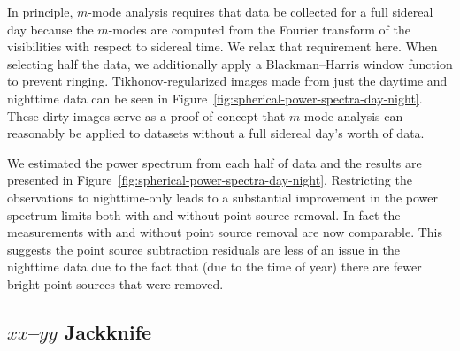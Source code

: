 \begin{bibunit}
In principle, $m$-mode analysis requires that data be collected for a full sidereal day because the
$m$-modes are computed from the Fourier transform of the visibilities with respect to sidereal time.
We relax that requirement here.  When selecting half the data, we additionally apply a
Blackman--Harris window function to prevent ringing. Tikhonov-regularized images made from just the
daytime and nighttime data can be seen in Figure~\ref{fig:spherical-power-spectra-day-night}. These
dirty images serve as a proof of concept that $m$-mode analysis can reasonably be applied to
datasets without a full sidereal day's worth of data.

We estimated the power spectrum from each half of data and the results are presented in
Figure~\ref{fig:spherical-power-spectra-day-night}. Restricting the observations to nighttime-only
leads to a substantial improvement in the power spectrum limits both with and without point source
removal. In fact the measurements with and without point source removal are now comparable. This
suggests the point source subtraction residuals are less of an issue in the nighttime data due to
the fact that (due to the time of year) there are fewer bright point sources that were removed.

\subsection{$xx$--$yy$ Jackknife}


\end{bibunit}
